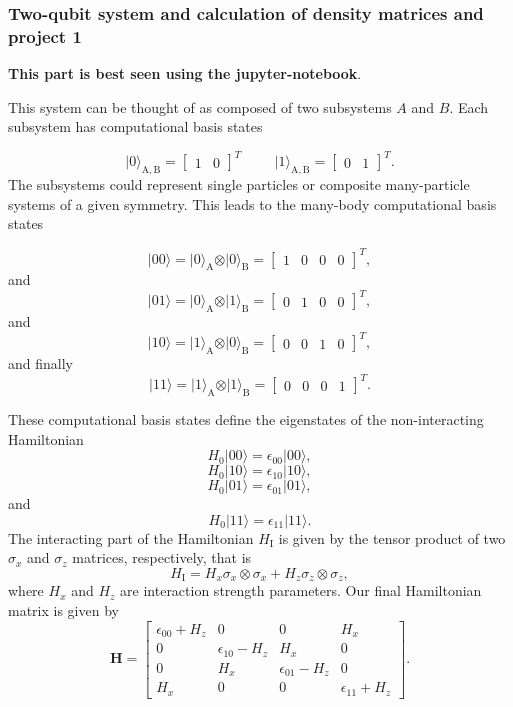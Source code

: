 \documentclass{beamer}
\begin{document}
\begin{frame}
\frametitle{Two-qubit system and calculation of density matrices and project 1}

\textbf{This part is best seen using the jupyter-notebook}.

This system can be thought of as composed of two subsystems
$A$ and $B$. Each subsystem has computational basis states

\[
\vert 0\rangle_{\mathrm{A,B}}=\begin{bmatrix} 1 & 0\end{bmatrix}^T \hspace{1cm} \vert 1\rangle_{\mathrm{A,B}}=\begin{bmatrix} 0 & 1\end{bmatrix}^T.
\]
The subsystems could represent single particles or composite many-particle systems of a given symmetry.
This leads to the many-body computational basis states

\[
\vert 00\rangle = \vert 0\rangle_{\mathrm{A}}\otimes \vert 0\rangle_{\mathrm{B}}=\begin{bmatrix} 1 & 0 & 0 &0\end{bmatrix}^T,
\]
and
\[
\vert 01\rangle = \vert 0\rangle_{\mathrm{A}}\otimes \vert 1\rangle_{\mathrm{B}}=\begin{bmatrix} 0 & 1 & 0 &0\end{bmatrix}^T,
\]
and
\[
\vert 10\rangle = \vert 1\rangle_{\mathrm{A}}\otimes \vert 0\rangle_{\mathrm{B}}=\begin{bmatrix} 0 & 0 & 1 &0\end{bmatrix}^T,
\]
and finally
\[
\vert 11\rangle = \vert 1\rangle_{\mathrm{A}}\otimes \vert 1\rangle_{\mathrm{B}}=\begin{bmatrix} 0 & 0 & 0 &1\end{bmatrix}^T.
\]

These computational basis states define the eigenstates of the non-interacting  Hamiltonian
\[
H_0\vert 00 \rangle = \epsilon_{00}\vert 00 \rangle,
\]
\[
H_0\vert 10 \rangle = \epsilon_{10}\vert 10 \rangle,
\]
\[
H_0\vert 01 \rangle = \epsilon_{01}\vert 01 \rangle,
\]
and
\[
H_0\vert 11 \rangle = \epsilon_{11}\vert 11 \rangle.
\]
The interacting part of the Hamiltonian $H_{\mathrm{I}}$ is given by the tensor product of two $\sigma_x$ and $\sigma_z$  matrices, respectively, that is
\[
H_{\mathrm{I}}=H_x\sigma_x\otimes\sigma_x+H_z\sigma_z\otimes\sigma_z,
\]
where $H_x$ and $H_z$ are interaction strength parameters. Our final Hamiltonian matrix is given by
\[
\bm{H}=\begin{bmatrix} \epsilon_{00}+H_z & 0 & 0 & H_x \\
                       0  & \epsilon_{10}-H_z & H_x & 0 \\
		       0 & H_x & \epsilon_{01}-H_z & 0 \\
		       H_x & 0 & 0 & \epsilon_{11} +H_z \end{bmatrix}.
\] 


\end{frame}
\end{document}
